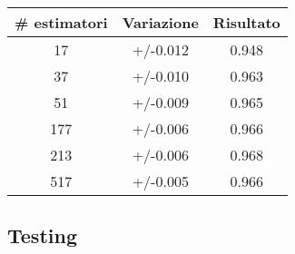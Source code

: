 \begin{table}[h]
\centering
\begin{tabular}{|c|c|c|}
\hline
\textbf{# estimatori} & \textbf{Variazione} & \textbf{Risultato} \\ \hline
17 & +/-0.012 & 0.948 \\ \hline
37 & +/-0.010 & 0.963 \\ \hline
51 & +/-0.009 & 0.965 \\ \hline
177 & +/-0.006 & 0.966 \\ \hline
213 & +/-0.006 & 0.968 \\ \hline
517 & +/-0.005 & 0.966 \\ \hline
\end{tabular}
\end{table}
\FloatBarrier

\subsection{Testing}

